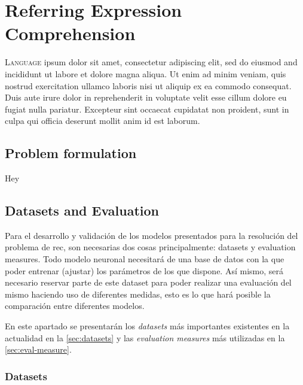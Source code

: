 

\chapter{Referring Expression Comprehension} \label{cha:rec}



\lettrine{L}{anguage} ipsum dolor sit amet, consectetur
adipiscing elit, sed do eiusmod and incididunt ut labore et dolore magna
aliqua. Ut enim ad minim veniam, quis nostrud exercitation ullamco laboris nisi
ut aliquip ex ea commodo consequat. Duis aute irure dolor in reprehenderit in
voluptate velit esse cillum dolore eu fugiat nulla pariatur. Excepteur sint
occaecat cupidatat non proident, sunt in culpa qui officia deserunt mollit anim
id est laborum.


\section{Problem formulation}

Hey


\section{Datasets and Evaluation}

Para el desarrollo y validación de los modelos presentados para la resolución
del problema de \gls{rec}, son necesarias dos cosas principalmente: datasets y
evaluation measures. Todo modelo neuronal necesitará de una base de datos con
la que poder entrenar (ajustar) los parámetros de los que dispone. Así mismo,
será necesario reservar parte de este dataset para poder realizar una
evaluación del mismo haciendo uso de diferentes medidas, esto es lo que hará
posible la comparación entre diferentes modelos.

En este apartado se presentarán los \emph{datasets} más importantes existentes en la
actualidad en la \vref{sec:datasets} y las \emph{evaluation measures}
más utilizadas en la \vref{sec:eval-measure}.

\subsection{Datasets} \label{sec:datasets}

